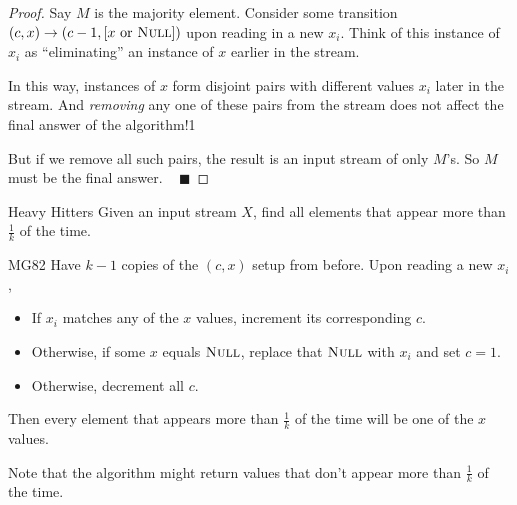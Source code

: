 \begin{proof}
    Say $M$ is the majority element.  Consider some transition $(c, x) \to (c - 1, [x \text{ or } \textsc{Null}])$ upon reading in a new $x_i$.  Think of this instance of $x_i$ as ``eliminating'' an instance of $x$ earlier in the stream.

    In this way, instances of $x$ form disjoint pairs with different values $x_i$ later in the stream.  And \emph{removing} any one of these pairs from the stream does not affect the final answer of the algorithm!1

    But if we remove all such pairs, the result is an input stream of only $M$'s.  So $M$ must be the final answer. ~ $\blacksquare$

    

\end{proof}

\begin{problem}{Heavy Hitters}
    Given an input stream $X$, find all elements that appear more than $\frac{1}{k}$ of the time.
\end{problem}

\begin{solution}{MG82}
    Have $k - 1$ copies of the $(c, x)$ setup from before.  Upon reading a new $x_i$,
    \begin{itemize}
        \item If $x_i$ matches any of the $x$ values, increment its corresponding $c$.
        \item Otherwise, if some $x$ equals $\textsc{Null}$, replace that $\textsc{Null}$ with $x_i$ and set $c = 1$.
        \item Otherwise, decrement all $c$.
    \end{itemize}
    Then every element that appears more than $\frac{1}{k}$ of the time will be one of the $x$ values.
\end{solution}

\begin{remark}
    Note that the algorithm might return values that don't appear more than $\frac{1}{k}$ of the time.
\end{remark}


